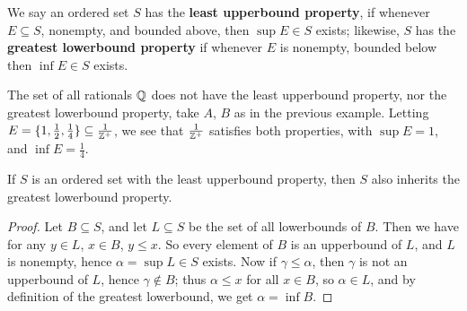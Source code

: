 \begin{definition}
    We say an ordered set $S$ has the \textbf{least upperbound property}, if whenever 
    $E \subseteq S$, nonempty, and bounded above, then  $\sup{E} \in S$ exists; likewise, $S$ has 
    the \textbf{greatest lowerbound property} if whenever $E$ is nonempty, bounded below 
    then $\inf{E} \in S$ exists.
\end{definition}

\begin{example}
    The set of all rationals $\mathbb{Q}$ does not have the least upperbound property, nor the 
    greatest lowerbound property, take $A$,  $B$ as in the previous example. Letting  
    $E=\{1, \frac{1}{2}, \frac{1}{4}\} \subseteq \frac{1}{\mathbb{Z}^+}$, we see that $\frac{1}{\mathbb{Z}^+}$ 
    satisfies both properties, with $\sup{E}=1$, and  $\inf{E}=\frac{1}{4}$.
\end{example} 

\begin{theorem}\label{1.1.2}
    If $S$ is an ordered set with the least upperbound property, then $S$ also inherits 
    the greatest lowerbound property.
\end{theorem}
\begin{proof}
    Let $B \subseteq S$, and let  $L \subseteq S$ be the set of all lowerbounds of $B$. Then we have 
    for any $y \in L$, $x \in B$, $y \leq x$. So every element of  $B$ is an upperbound of  $L$, and 
    $L$ is nonempty, hence $\alpha=\sup{L} \in S$ exists. Now if  $\gamma \leq \alpha$, then 
     $\gamma$ is not an upperbound of  $L$, hence  $\gamma \notin B$; thus  $\alpha \leq x$ for all 
      $x \in B$, so  $\alpha \in L$, and by definition of the greatest lowerbound, we get 
      $\alpha=\inf{B}$.
\end{proof}
